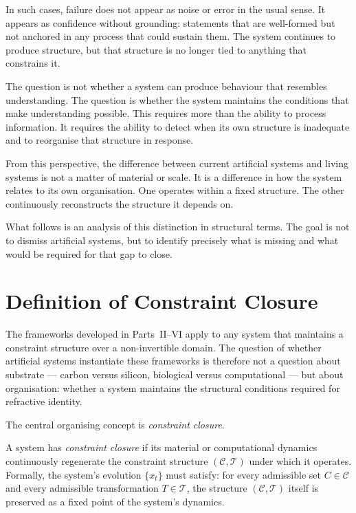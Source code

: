 \documentclass[11pt,openany]{book}
\begin{document}
In such cases, failure does not appear as noise or error in
the usual sense.  It appears as confidence without
grounding: statements that are well-formed but not anchored
in any process that could sustain them.  The system continues
to produce structure, but that structure is no longer tied
to anything that constrains it.

The question is not whether a system can produce behaviour
that resembles understanding.  The question is whether the
system maintains the conditions that make understanding
possible.  This requires more than the ability to process
information.  It requires the ability to detect when its own
structure is inadequate and to reorganise that structure in
response.

From this perspective, the difference between current
artificial systems and living systems is not a matter of
material or scale.  It is a difference in how the system
relates to its own organisation.  One operates within a
fixed structure.  The other continuously reconstructs the
structure it depends on.

What follows is an analysis of this distinction in
structural terms.  The goal is not to dismiss artificial
systems, but to identify precisely what is missing and what
would be required for that gap to close.

\section{Definition of Constraint Closure}
\label{sec:closure-definition}

The frameworks developed in Parts~II--VI apply to any
system that maintains a constraint structure over a
non-invertible domain.  The question of whether artificial
systems instantiate these frameworks is therefore not a
question about substrate — carbon versus silicon, biological
versus computational — but about organisation: whether a
system maintains the structural conditions required for
refractive identity.

The central organising concept is \emph{constraint closure}.

\begin{definition}
\label{def:constraint-closure}
A system has \emph{constraint closure} if its material or
computational dynamics continuously regenerate the
constraint structure $(\mathcal{C}, \mathcal{T})$ under
which it operates.  Formally, the system's evolution
$\{x_t\}$ must satisfy: for every admissible set $C \in
\mathcal{C}$ and every admissible transformation $T \in
\mathcal{T}$, the structure $(\mathcal{C}, \mathcal{T})$
itself is preserved as a fixed point of the system's
dynamics.
\end{definition}
\end{document}
